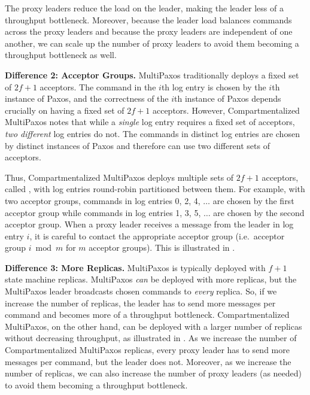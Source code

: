 The proxy leaders reduce the load on the leader, making the leader less of a
throughput bottleneck. Moreover, because the leader load balances commands
across the proxy leaders and because the proxy leaders are independent of one
another, we can scale up the number of proxy leaders to avoid them becoming a
throughput bottleneck as well.

\textbf{Difference 2: Acceptor Groups.}
MultiPaxos traditionally deploys a fixed set of $2f+1$ acceptors. The command
in the $i$th log entry is chosen by the $i$th instance of Paxos, and the
correctness of the $i$th instance of Paxos depends crucially on having a fixed
set of $2f+1$ acceptors. However, Compartmentalized MultiPaxos notes that while
a \emph{single} log entry requires a fixed set of acceptors, \emph{two
different} log entries do not. The commands in distinct log entries are chosen
by distinct instances of Paxos and therefore can use two different sets of
acceptors.

Thus, Compartmentalized MultiPaxos deploys multiple sets of $2f+1$ acceptors,
called , with log entries round-robin partitioned
between them. For example, with two acceptor groups, commands in log entries 0,
2, 4, $\ldots$ are chosen by the first acceptor group while commands in log
entries 1, 3, 5, $\ldots$ are chosen by the second acceptor group. When a proxy
leader receives a  message from the leader in log entry $i$,
it is careful to contact the appropriate acceptor group (i.e.\ acceptor group
$i \bmod m$ for $m$ acceptor groups).
%
This is illustrated in .

{}

\textbf{Difference 3: More Replicas.}
MultiPaxos is typically deployed with $f+1$ state machine replicas. MultiPaxos
\emph{can} be deployed with more replicas, but the MultiPaxos leader broadcasts
chosen commands to \emph{every} replica. So, if we increase the number of
replicas, the leader has to send more messages per command and becomes more of
a throughput bottleneck.
%
Compartmentalized MultiPaxos, on the other hand, can be deployed with a larger
number of replicas without decreasing throughput, as illustrated in
. As we increase the number of
Compartmentalized MultiPaxos replicas, every proxy leader has to send more
messages per command, but the leader does not.  Moreover, as we increase the
number of replicas, we can also increase the number of proxy leaders (as
needed) to avoid them becoming a throughput bottleneck.

